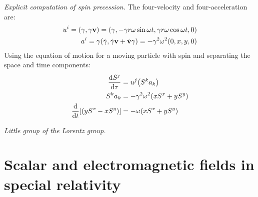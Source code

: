 \documentclass{report}
\begin{document}
\begin{subquests}
	\item \emph{Explicit computation of spin precession.}
	The four-velocity and four-acceleration are:
	\begin{align*}
		u^i = \pqty{\gamma, \gamma \vb v} = \pqty{\gamma, -\gamma r\omega\sin\omega t, \gamma r\omega\cos\omega t, 0} \\
		a^i = \gamma\pqty{\dot{\gamma}, \dot{\gamma}\vb v + \dot{\vb v}\gamma} = -\gamma^2 \omega^2\pqty{0,x,y,0}
	\end{align*}
	Using the equation of motion for a moving particle with spin and separating the space and time components:
	\begin{align*}
		\dv{S^j}{\tau} & = u^j \pqty{S^k a_k} \\
		S^k a_k & = -\gamma^2 \omega^2 \pqty{xS^x + yS^y} \\
		\dv{t}\bqty{\pqty{yS^x - xS^y}} & = -\omega\pqty{xS^x + yS^y}
	\end{align*}

	\item \emph{Little group of the Lorentz group.}
\end{subquests}


\chapter{Scalar and electromagnetic fields in special relativity}
\end{document}
